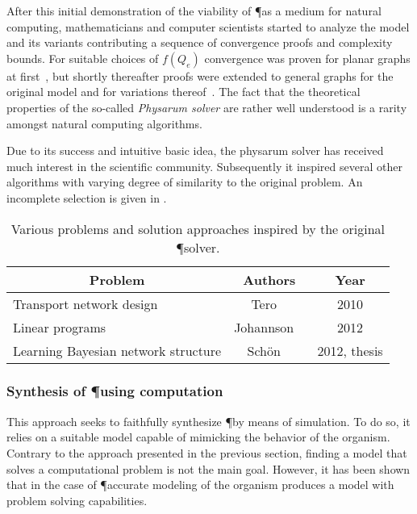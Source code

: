 			After this initial demonstration of the viability of \P as a medium for natural computing, mathematicians and computer scientists started to analyze the model and its variants contributing a sequence of convergence proofs and complexity bounds. For suitable choices of $f(Q_e)$ convergence was proven for planar graphs at first~\cite{miyaji2007mathematical,miyaji2008physarum}, but shortly thereafter proofs were extended to general graphs for the original model and for variations thereof~\cite{Bonifaci2012121,bonifaci2013physarum,ito2011convergence,becchetti2013physarum}. The fact that the theoretical properties of the so-called \emph{Physarum solver} are rather well understood is a rarity amongst natural computing algorithms.

			Due to its success and intuitive basic idea, the physarum solver has received much interest in the scientific community. Subsequently it inspired several other algorithms with varying degree of similarity to the original problem. An incomplete selection is given in . 

			\begin{table}
				\centering
				\begin{tabular}{@{} l *2c @{}}
				\toprule
				 \multicolumn{1}{c}{Problem}    & Authors  & Year   \\ 
				\midrule
				 Transport network design & Tero \etal~\cite{tero2010rules} & 2010 \\
				 Linear programs & Johannson \etal~\cite{Johannson2012} & 2012  \\ 
				 Learning Bayesian network structure & Sch\"on \etal~\cite{schon2012structure} & 2012, thesis  \\ 
				\bottomrule
				\end{tabular}
				\caption[Computing inspired by \P]{Various problems and solution approaches inspired by the original \P solver.}
				\label{tab:list_inspired}
			\end{table}

			\FloatBarrier

		\subsubsection{Synthesis of \P using computation}

			This approach seeks to faithfully synthesize \P by means of simulation. To do so, it relies on a suitable model capable of mimicking the behavior of the organism. Contrary to the approach presented in the previous section, finding a model that solves a computational problem is not the main goal. However, it has been shown that in the case of \P accurate modeling of the organism produces a model with problem solving capabilities. 

